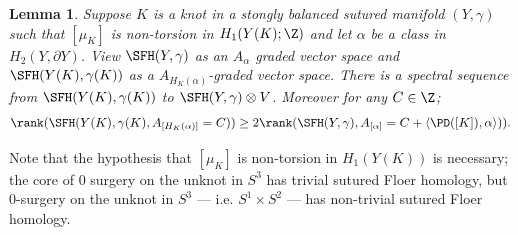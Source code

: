 \documentclass{amsart}
\newtheorem{lemma}[theorem]{Lemma}
\theoremstyle{definition}
\theoremstyle{remark}
\numberwithin{equation}{section}
\begin{document}
\begin{lemma}\label{lem:spectral}
    Suppose $K$ is a knot in a stongly balanced sutured manifold $(Y,\gamma)$ such that $[\mu_K]$ is non-torsion in $ H_1(Y(K);\Z)$ and let $\alpha$ be a class in  $H_2(Y,\partial Y)$. View $\SFH(Y,\gamma)$ as an $A_\alpha$ graded vector space and $\SFH(Y(K),\gamma(K))$ as a $A_{H_K(\alpha)}$-graded vector space. There is a spectral sequence from $\SFH(Y(K),\gamma(K))$ to $\SFH(Y,\gamma)\otimes V$. Moreover 
  for any $C\in\Z$;
    \begin{align}\rank(\SFH(Y(K),\gamma(K),A_{[H_K(\alpha)]}=C))\geq2\rank(\SFH(Y,\gamma),A_{[\alpha]}=C+ \langle \PD([K]),\alpha\rangle)).
    \end{align}

\end{lemma}

Note that the hypothesis that $[\mu_K]$ is non-torsion in $H_1(Y(K))$ is necessary; the core of $0$ surgery on the unknot in $S^3$ has trivial sutured Floer homology, but $0$-surgery on the unknot in $S^3$ --- i.e. $S^1\times S^2$ --- has non-trivial sutured Floer homology.
\end{document}
